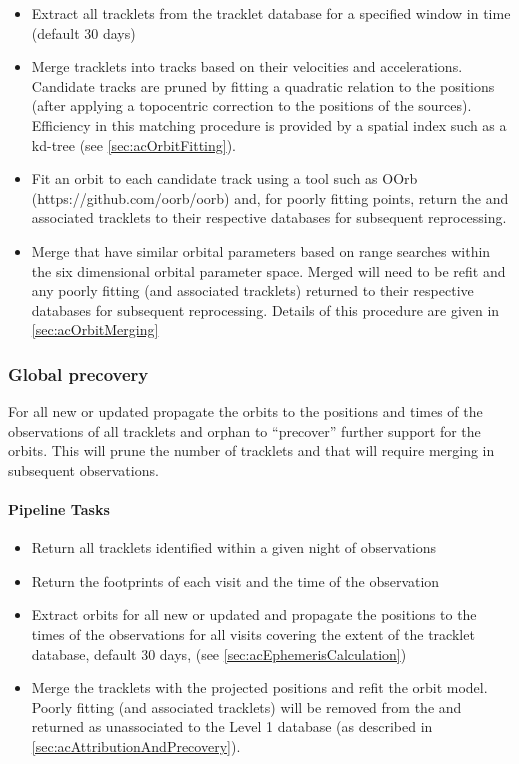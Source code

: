 \begin{itemize}
\item Extract all tracklets from the tracklet database for a specified window in time (default 30 days)
\item Merge tracklets into tracks based on their velocities and accelerations. Candidate tracks are pruned by fitting a quadratic relation to the positions (after applying a topocentric correction to the positions of the sources). Efficiency in this matching procedure is provided by a spatial index such as a kd-tree (see \ref{sec:acOrbitFitting}).
\item Fit an orbit to each candidate track using a tool such as OOrb \\(https://github.com/oorb/oorb) and, for poorly fitting  points, return the \DIASources and associated tracklets to their respective databases for subsequent reprocessing.
\item Merge \SSObjects that have similar orbital parameters based on range searches within the six dimensional orbital parameter space.  Merged \SSObjects will need to be refit and any poorly fitting \DIASources (and associated tracklets) returned  to their respective databases for subsequent reprocessing. Details of this procedure are given in \ref{sec:acOrbitMerging}
\end{itemize}

\subsubsection{Global precovery}

For all new or updated \SSObjects propagate the orbits to the positions and times of the observations of all tracklets and orphan \DIAObjects to ``precover'' further support for the orbits. This will prune the number of tracklets and \DIAObjects that will require merging in subsequent observations.

\paragraph{Pipeline Tasks}

\begin{itemize}
\item Return all tracklets identified within a given night of observations
\item Return the footprints of each visit and the time of the observation
\item Extract orbits for all new or updated \SSObjects and propagate the positions to the times of the observations for all visits covering the extent of the tracklet database, default 30 days, (see \ref{sec:acEphemerisCalculation})
\item Merge the tracklets with the projected \SSObject positions and refit the \SSObject orbit model. Poorly fitting \DIASources (and associated tracklets) will be removed from the \SSObject and returned as unassociated \DIAObjects to the Level 1 database (as described in \ref{sec:acAttributionAndPrecovery}).
\end{itemize}


